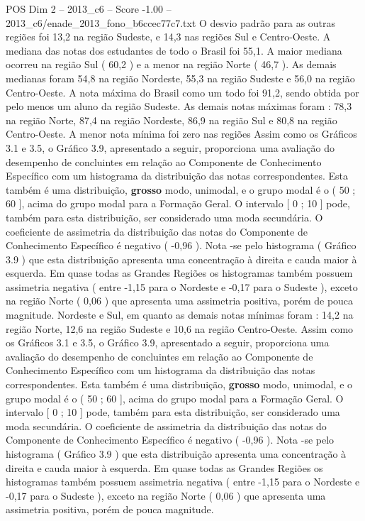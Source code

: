 \begin{textsample}{POS Dim 2 – 2013\_c6 – Score -1.00 – 2013\_c6/enade\_2013\_fono\_b6ccec77c7.txt}
O desvio padrão para as outras regiões foi 13,2 na região Sudeste, e 14,3 nas regiões Sul e Centro-Oeste.
A mediana das notas dos estudantes de todo o Brasil foi 55,1.
A maior mediana ocorreu na região Sul ( 60,2 ) e a menor na região Norte ( 46,7 ).
As demais medianas foram 54,8 na região Nordeste, 55,3 na região Sudeste e 56,0 na região Centro-Oeste.
A nota máxima do Brasil como um todo foi 91,2, sendo obtida por pelo menos um aluno da região Sudeste.
As demais notas máximas foram : 78,3 na região Norte, 87,4 na região Nordeste, 86,9 na região Sul e 80,8 na região Centro-Oeste.
A menor nota mínima foi zero nas regiões Assim como os Gráficos 3.1 e 3.5, o Gráfico 3.9, apresentado a seguir, proporciona uma avaliação do desempenho de concluintes em relação ao Componente de Conhecimento Específico com um histograma da distribuição das notas correspondentes.
Esta também é uma distribuição, \textbf{grosso} modo, unimodal, e o grupo modal é o ( 50 ; 60 ], acima do grupo modal para a Formação Geral.
O intervalo [ 0 ; 10 ] pode, também para esta distribuição, ser considerado uma moda secundária.
O coeficiente de assimetria da distribuição das notas do Componente de Conhecimento Específico é negativo ( -0,96 ).
Nota -se pelo histograma ( Gráfico 3.9 ) que esta distribuição apresenta uma concentração à direita e cauda maior à esquerda.
Em quase todas as Grandes Regiões os histogramas também possuem assimetria negativa ( entre -1,15 para o Nordeste e -0,17 para o Sudeste ), exceto na região Norte ( 0,06 ) que apresenta uma assimetria positiva, porém de pouca magnitude.
Nordeste e Sul, em quanto as demais notas mínimas foram : 14,2 na região Norte, 12,6 na região Sudeste e 10,6 na região Centro-Oeste.
Assim como os Gráficos 3.1 e 3.5, o Gráfico 3.9, apresentado a seguir, proporciona uma avaliação do desempenho de concluintes em relação ao Componente de Conhecimento Específico com um histograma da distribuição das notas correspondentes.
Esta também é uma distribuição, \textbf{grosso} modo, unimodal, e o grupo modal é o ( 50 ; 60 ], acima do grupo modal para a Formação Geral.
O intervalo [ 0 ; 10 ] pode, também para esta distribuição, ser considerado uma moda secundária.
O coeficiente de assimetria da distribuição das notas do Componente de Conhecimento Específico é negativo ( -0,96 ).
Nota -se pelo histograma ( Gráfico 3.9 ) que esta distribuição apresenta uma concentração à direita e cauda maior à esquerda.
Em quase todas as Grandes Regiões os histogramas também possuem assimetria negativa ( entre -1,15 para o Nordeste e -0,17 para o Sudeste ), exceto na região Norte ( 0,06 ) que apresenta uma assimetria positiva, porém de pouca magnitude.

\end{textsample}
